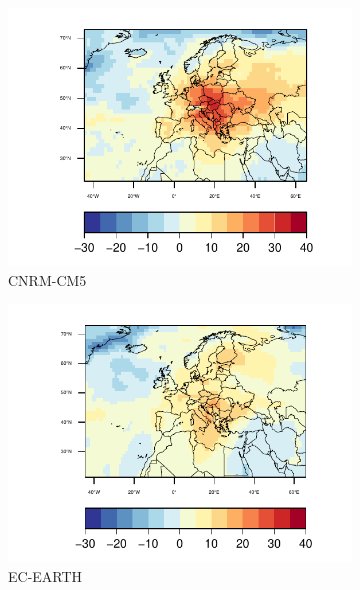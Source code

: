 \begin{figure}[h]
  \centering\begin{subfigure}{0.4\textwidth}
    \includegraphics[width=1.2\textwidth]{figs/capitulo7/CNRM-CM5_ANOMALIAS_JJA_SSR_2050-2021.pdf}
    \caption{CNRM-CM5}
  \end{subfigure}
  \centering\begin{subfigure}{0.4\textwidth}
    \includegraphics[width=1.2\textwidth]{figs/capitulo7/EC-EARTH_ANOMALIAS_JJA_SSR_2050-2021.pdf}\hfill
    \caption{EC-EARTH}
  \end{subfigure}
  \hspace{0.1mm}
  \centering\begin{subfigure}{1\textwidth}  

\end{subfigure}
\end{figure}
